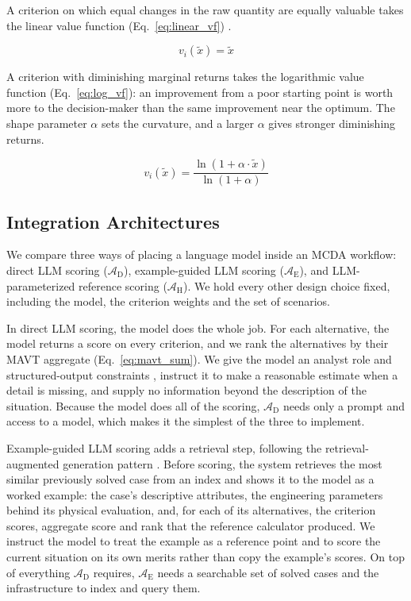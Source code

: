 \documentclass[final,3p,times]{elsarticle}
\begin{document}
A criterion on which equal changes in the raw quantity are equally valuable takes the linear value function (Eq.~\ref{eq:linear_vf}) \cite{dyer1979,keeneyraiffa1976}.

\begin{equation}
\label{eq:linear_vf}
v_i(\tilde{x}) = \tilde{x}
\end{equation}

A criterion with diminishing marginal returns takes the logarithmic value function (Eq.~\ref{eq:log_vf}): an improvement from a poor starting point is worth more to the decision-maker than the same improvement near the optimum. The shape parameter $\alpha$ sets the curvature, and a larger $\alpha$ gives stronger diminishing returns.

\begin{equation}
\label{eq:log_vf}
v_i(\tilde{x}) = \frac{\ln\!\left(1 + \alpha \cdot \tilde{x}\right)}{\ln(1 + \alpha)}
\end{equation}

\FloatBarrier
\subsection{Integration Architectures}
\label{sec:architectures}

We compare three ways of placing a language model inside an MCDA workflow: direct LLM scoring ($\mathcal{A}_{\text{D}}$), example-guided LLM scoring ($\mathcal{A}_{\text{E}}$), and LLM-parameterized reference scoring ($\mathcal{A}_{\text{H}}$). We hold every other design choice fixed, including the model, the criterion weights and the set of scenarios.

In direct LLM scoring, the model does the whole job. For each alternative, the model returns a score on every criterion, and we rank the alternatives by their MAVT aggregate (Eq.~\ref{eq:mavt_sum}). We give the model an analyst role and structured-output constraints \cite{icaart26}, instruct it to make a reasonable estimate when a detail is missing, and supply no information beyond the description of the situation. Because the model does all of the scoring, $\mathcal{A}_{\text{D}}$ needs only a prompt and access to a model, which makes it the simplest of the three to implement.

Example-guided LLM scoring adds a retrieval step, following the retrieval-augmented generation pattern \cite{lewis2020}. Before scoring, the system retrieves the most similar previously solved case from an index and shows it to the model as a worked example: the case's descriptive attributes, the engineering parameters behind its physical evaluation, and, for each of its alternatives, the criterion scores, aggregate score and rank that the reference calculator produced. We instruct the model to treat the example as a reference point and to score the current situation on its own merits rather than copy the example's scores. On top of everything $\mathcal{A}_{\text{D}}$ requires, $\mathcal{A}_{\text{E}}$ needs a searchable set of solved cases and the infrastructure to index and query them.
\end{document}
